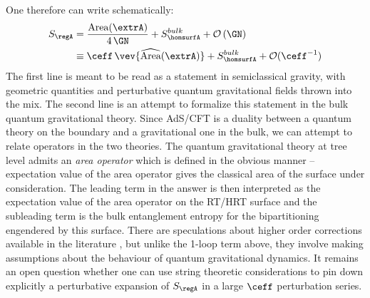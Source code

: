 \documentclass[12pt,openany]{book}
\begin{document}
One therefore can write schematically:
%
\begin{equation}
\begin{split}
S_\regA &= \frac{\text{Area}(\extrA)}{4\, \GN} + S_{\homsurfA}^{bulk}  + {\cal O}\left(\GN\right)
 \\
&\equiv  \ceff\, \vev{\widehat{\text{Area}}(\extrA)} + S_{\homsurfA}^{bulk} + {\cal O}(\ceff^{-1})
\end{split}
\label{eq:1loop}
\end{equation}
%
The first line is meant to be read as a statement in semiclassical gravity, with geometric quantities and perturbative quantum gravitational fields thrown into the mix. The second line is an attempt to formalize this statement in the bulk quantum gravitational theory. Since AdS/CFT is a duality between a quantum theory on the boundary and a gravitational one in the bulk, we can attempt to relate operators in the two theories. The quantum gravitational theory at tree level admits an \emph{area operator} which is defined in the obvious manner -- expectation value of the area operator gives the classical area of the surface under consideration. The leading term in the answer is then interpreted as the expectation value of the area operator on the RT/HRT surface and the subleading term is the bulk entanglement entropy for the bipartitioning engendered by this surface. There are speculations about higher order corrections available in the literature \cite{Engelhardt:2014gca}, but unlike the 1-loop term above, they involve making assumptions about the behaviour of quantum gravitational dynamics.  It remains an open question whether one can use string theoretic considerations to pin down explicitly a perturbative expansion of $S_\regA$ in a large $\ceff$ perturbation series.
\end{document}

